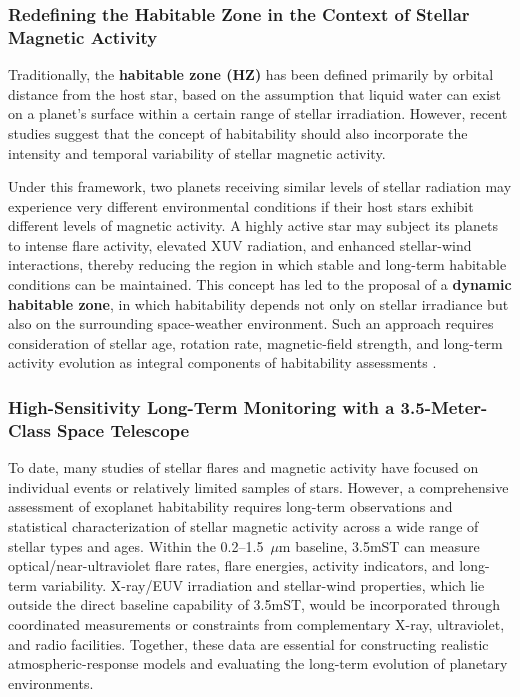 \subsubsection{Redefining the Habitable Zone in the Context of Stellar Magnetic Activity}

Traditionally, the \textbf{habitable zone (HZ)} has been defined primarily by orbital distance from the host star, based on the assumption that liquid water can exist on a planet's surface within a certain range of stellar irradiation. However, recent studies suggest that the concept of habitability should also incorporate the intensity and temporal variability of stellar magnetic activity.

Under this framework, two planets receiving similar levels of stellar radiation may experience very different environmental conditions if their host stars exhibit different levels of magnetic activity. A highly active star may subject its planets to intense flare activity, elevated XUV radiation, and enhanced stellar-wind interactions, thereby reducing the region in which stable and long-term habitable conditions can be maintained. This concept has led to the proposal of a \textbf{dynamic habitable zone}, in which habitability depends not only on stellar irradiance but also on the surrounding space-weather environment. Such an approach requires consideration of stellar age, rotation rate, magnetic-field strength, and long-term activity evolution as integral components of habitability assessments \cite{hong2023}.

\subsubsection{High-Sensitivity Long-Term Monitoring with a 3.5-Meter-Class Space Telescope}

To date, many studies of stellar flares and magnetic activity have focused on individual events or relatively limited samples of stars. However, a comprehensive assessment of exoplanet habitability requires long-term observations and statistical characterization of stellar magnetic activity across a wide range of stellar types and ages. Within the 0.2--1.5~$\mu$m baseline, 3.5mST can measure optical/near-ultraviolet flare rates, flare energies, activity indicators, and long-term variability. X-ray/EUV irradiation and stellar-wind properties, which lie outside the direct baseline capability of 3.5mST, would be incorporated through coordinated measurements or constraints from complementary X-ray, ultraviolet, and radio facilities. Together, these data are essential for constructing realistic atmospheric-response models and evaluating the long-term evolution of planetary environments.

